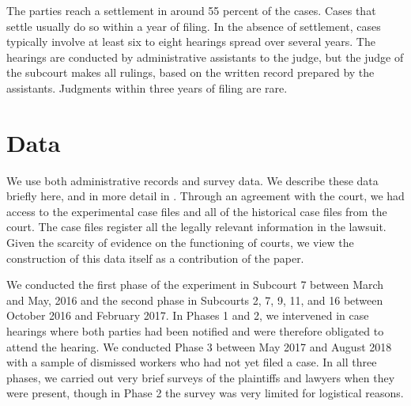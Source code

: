 \documentclass[11pt, a4paper]{article}
\begin{document}
The parties reach a settlement in around 55 percent of the cases. Cases that settle usually do so within a year of filing. In the absence of settlement, cases typically involve at least six to eight hearings spread over several years. The hearings are conducted by administrative assistants to the judge, but the judge of the subcourt makes all rulings, based on the written record prepared by the assistants. Judgments within three years of filing are rare. 


\section{Data} \label{DataSection}

We use both administrative records and survey data. We describe these data briefly here, and in more detail in . Through an agreement with the court, we had access to the experimental case files and all of the historical case files from the court. The case files register all the legally relevant information in the lawsuit. Given the scarcity of evidence on the functioning of courts, we view the construction of this data itself as a contribution of the paper.

We conducted the first phase of the experiment in Subcourt 7 between March and May, 2016 and the second phase in Subcourts 2, 7, 9, 11, and 16 between October 2016 and February 2017. In Phases 1 and 2, we intervened in case hearings where both parties had been notified and were therefore obligated to attend the hearing. We conducted Phase 3 between May 2017 and August 2018 with a sample of dismissed workers who had not yet filed a case. In  all three phases, we carried out very brief surveys of the plaintiffs and lawyers when they were present, though in Phase 2 the survey was very limited for logistical reasons. 
\end{document}
